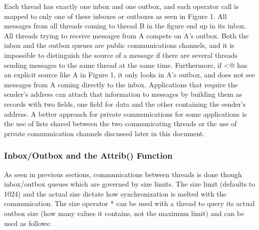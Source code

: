 
Each thread has exactly one inbox and one outbox, and each operator call
is mapped to only one of these inboxes or outboxes as seen in Figure 1.
All messages from all threads coming to thread B in the figure end up
in its inbox. All threads trying to receive messages from A compete on
A{\textquoteright}s outbox. Both the inbox and the outbox queues are
public communications channels, and it is impossible to distinguish the
source of a message if there are several threads sending messages to
the same thread at the same time. Furthermore, if
\textsf{{\textless}@} has an explicit source like A in
Figure 1, it only looks in A{\textquoteright}s outbox, and does not see
messages from A coming directly to the inbox. Applications that require
the sender{\textquoteright}s address can attach that information to
messages by building them as records with two fields, one field for
data and the other containing the sender{\textquoteright}s address. A
better approach for private communications for some applications is the
use of lists shared between the two communicating threads or the use of
private communication channels discussed later in this document. 

\subsubsection[Inbox/Outbox and the Attrib() Function ]{Inbox/Outbox and
the \textsf{Attrib()} Function }

As seen in previous sections, communications between threads is done
though inbox/outbox queues which are governed by size limits. The size
limit (defaults to 1024) and the actual size dictate how synchronization
is melted with the communication. The size operator * can be used with
a thread to query its actual outbox size (how many values it contains,
not the maximum limit) and can be used as follows:

